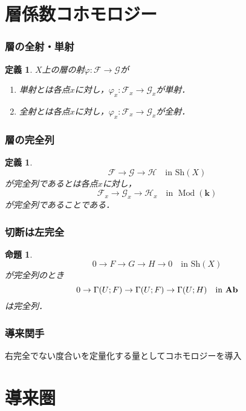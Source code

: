 \documentclass[dvipdfmx,12pt,aspectratio=169,leqno]{beamer}%
\newcommand{\kk}{\mathbf{k}}
\newcommand{\Ab}{{\bf Ab}}
\newcommand{\Mod}{\mathop{\mathrm{Mod}}\nolimits}
\numberwithin{equation}{subsection}
\newcommand{\Sh}{\mathrm{Sh}}
\theoremstyle{mystyle}
\newtheorem{DFN}[AXM]{定義}
\newtheorem{PRP}[AXM]{命題}
\begin{document}
\section[層係数コホモロジー]{層係数コホモロジー}
\begin{frame}
    \frametitle{層の全射・単射}
    \begin{DFN}
        \(X\)上の層の射\(\varphi\colon\mathscr{F}\to\mathscr{G}\)が
        \begin{enumerate}
            \item 単射とは各点\(x\)に対し，\(\varphi_x\colon\mathscr{F}_x\to\mathscr{G}_x\)が単射．
            \item 全射とは各点\(x\)に対し，\(\varphi_x\colon\mathscr{F}_x\to\mathscr{G}_x\)が全射．
        \end{enumerate}
    \end{DFN}
\end{frame}

\begin{frame}
    \frametitle{層の完全列}
    \begin{DFN}
        \[
            \mathscr{F}\to
            \mathscr{G}\to
            \mathscr{H}
            \quad
            \text{in \(\Sh(X)\)}
        \]が完全列であるとは各点\(x\)に対し，
        \[
            \mathscr{F}_x\to
            \mathscr{G}_x\to
            \mathscr{H}_x
            \quad
            \text{in \(\Mod(\kk)\)}
        \]
        が完全列であることである．
    \end{DFN}    
\end{frame}

\begin{frame}
    \frametitle{切断は左完全}
    \begin{PRP}
        \[
            0\to F\to G\to H\to 0
            \quad
            \text{in \(\Sh(X)\)}
        \]が完全列のとき
        \[
            0\to \Gamma(U;F)\to \Gamma(U;F)\to \Gamma(U;H)
            \quad
            \text{in \(\Ab\)}
        \]は完全列．
    \end{PRP}
\end{frame}

\begin{frame}
    \frametitle{導来関手}
    右完全でない度合いを定量化する量としてコホモロジーを導入
\end{frame}








\section[導来圏]{導来圏}
\end{document}
